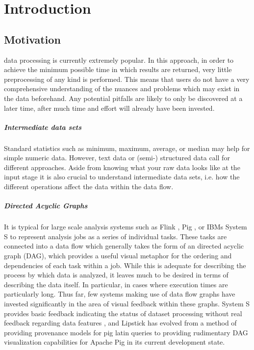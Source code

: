 \chapter{Introduction}
\label{sec:Introduction}



\section{Motivation}
 data processing is currently extremely popular. In this approach, in order to achieve the minimum possible time in which results are returned, very little preprocessing of any kind is performed. This means that users do not have a very comprehensive understanding of the nuances and problems which may exist in the data beforehand. Any potential pitfalls are likely to only be discovered at a later time, after much time and effort will already have been invested.

\paragraph{Intermediate data sets}
Standard statistics such as minimum, maximum, average, or median may help for simple numeric data. However, text data or (semi-) structured data call for different approaches. Aside from knowing what your raw data looks like at the input stage it is also crucial to understand intermediate data sets, i.e. how the different operations affect the data within the data flow.

\paragraph{Directed Acyclic Graphs}
It is typical for large scale analysis systems such as Flink \citep{Battre2010}, Pig \citep{Gates2009}, or IBMs System S \citep{Gedik2008} to represent analysis jobs as a series of individual tasks. These tasks are connected into a data flow which generally takes the form of an directed acyclic graph (DAG), which provides a useful visual metaphor for the ordering and dependencies of each task within a job. While this is adequate for describing the process by which data is analyzed, it leaves much to be desired in terms of describing the data itself. In particular, in cases where execution times are particularly long. Thus far, few systems making use of data flow graphs have invested significantly in the area of visual feedback within these graphs. System S provides basic feedback indicating the status of dataset processing without real feedback regarding data features \citep{Pauw2010}, and Lipstick \citep{Amsterdamer2011} has evolved from a method of providing provenance models for pig latin queries to providing rudimentary DAG visualization capabilities for Apache Pig \citep{Gates2009} in its current development state.

